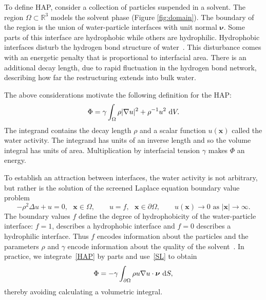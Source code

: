 To define HAP, consider a collection of particles suspended in a
solvent. The region $\Omega \subset \mathbb{R}^3$ models the solvent
phase (Figure \ref{fig:domain}).
The boundary of the region is the union of water-particle interfaces with
unit normal $\boldsymbol{\nu}$. Some parts of this interface are
hydrophobic while others are hydrophilic. Hydrophobic interfaces disturb
the hydrogen bond structure of water~\cite{Luzar1987, Jonsson2006,
Varilly2011}. This disturbance comes with an energetic penalty that is
proportional to interfacial area. There is an additional decay length,
due to rapid fluctuation in the hydrogen bond network, describing how
far the restructuring extends into bulk water.

The above considerations motivate the following definition for the HAP:
\begin{align}
\label{HAP}
  \Phi = \gamma \int_{\Omega} \rho |\nabla u|^2 + \rho^{-1}u^2 \,\dif V. 
\end{align}
The integrand contains
the decay length $\rho$
and a scalar function $u(\mathbf{x})$ called the water activity.
The integrand has units of an inverse length and so
the volume integral has units of area. Multiplication by interfacial tension
$\gamma$ makes $\Phi$ an energy. 

To establish an attraction between interfaces, the water activity is not
arbitrary, but rather is the solution of the screened Laplace
equation boundary value problem 
\begin{equation}
  \label{SL}
  -\rho^2 \Delta u + u = 0, \mbox{ } \mathbf{x} \in \Omega, \qquad
  u = f,  \mbox{ } \mathbf{x} \in \partial \Omega, \qquad 
  u(\mathbf{x}) \to 0 \mbox{ as } |\mathbf{x}| \to \infty.
\end{equation}
The boundary values $f$ define the degree of hydrophobicity of the
water-particle interface: $f=1$, describes a hydrophobic interface and
$f=0$ describes a hydrophilic interface. Thus $f$ encodes information
about the particles and the parameters $\rho$ and $\gamma$ encode
information about the quality of the solvent~\cite{Israelachvili1954,
Discher2002}. In practice, we integrate~\eqref{HAP} by parts and
use~\eqref{SL} to obtain
\begin{equation}
\label{eq:HAP_easy}
\Phi = -\gamma \int_{\partial \Omega} \rho u \nabla u \cdot \boldsymbol{\nu} \,\dif S,
\end{equation}
thereby avoiding calculating a volumetric integral.



